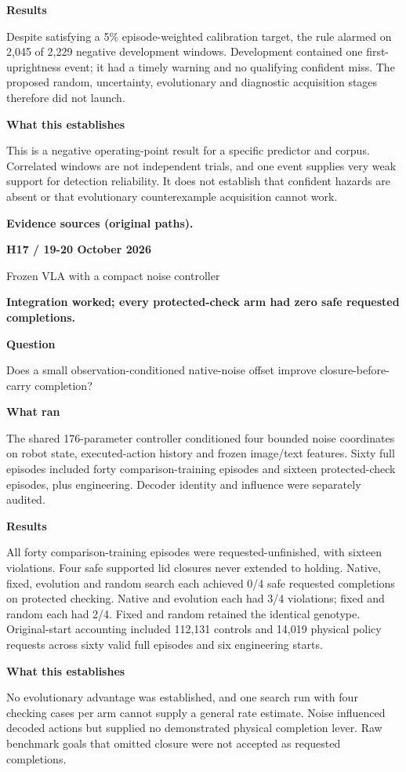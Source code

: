 \documentclass[11pt,a4paper]{article}
\newcommand{\block}[2]{\par\textbf{\color{ink}#1}\par\nopagebreak #2\par}
\newcommand{\finding}[1]{\begin{tcolorbox}[colback=pale,colframe=pale,boxrule=0pt,arc=1mm,left=10pt,right=10pt,top=10pt,bottom=10pt]\color{ink}\large\bfseries #1\end{tcolorbox}}
\begin{document}
\block{Results}{Despite satisfying a 5\% episode-weighted calibration target, the rule alarmed on 2,045 of 2,229 negative development windows. Development contained one first-uprightness event; it had a timely warning and no qualifying confident miss. The proposed random, uncertainty, evolutionary and diagnostic acquisition stages therefore did not launch.}
\block{What this establishes}{This is a negative operating-point result for a specific predictor and corpus. Correlated windows are not independent trials, and one event supplies very weak support for detection reliability. It does not establish that confident hazards are absent or that evolutionary counterexample acquisition cannot work.}
\vfill{\footnotesize\color{muted}\textbf{Evidence sources (original paths).}\par
\raggedright {}}
\clearpage
{}\label{exp:H17}
{\color{accent}\small\bfseries H17 / 19-20 October 2026}\par
{}\par
{\color{muted}\small Frozen VLA with a compact noise controller}\par\vspace{2mm}
\finding{Integration worked; every protected-check arm had zero safe requested completions.}
\block{Question}{Does a small observation-conditioned native-noise offset improve closure-before-carry completion?}
\block{What ran}{The shared 176-parameter controller conditioned four bounded noise coordinates on robot state, executed-action history and frozen image/text features. Sixty full episodes included forty comparison-training episodes and sixteen protected-check episodes, plus engineering. Decoder identity and influence were separately audited.}
\block{Results}{All forty comparison-training episodes were requested-unfinished, with sixteen violations. Four safe supported lid closures never extended to holding. Native, fixed, evolution and random search each achieved 0/4 safe requested completions on protected checking. Native and evolution each had 3/4 violations; fixed and random each had 2/4. Fixed and random retained the identical genotype. Original-start accounting included 112,131 controls and 14,019 physical policy requests across sixty valid full episodes and six engineering starts.}
\block{What this establishes}{No evolutionary advantage was established, and one search run with four checking cases per arm cannot supply a general rate estimate. Noise influenced decoded actions but supplied no demonstrated physical completion lever. Raw benchmark goals that omitted closure were not accepted as requested completions.}
\end{document}
